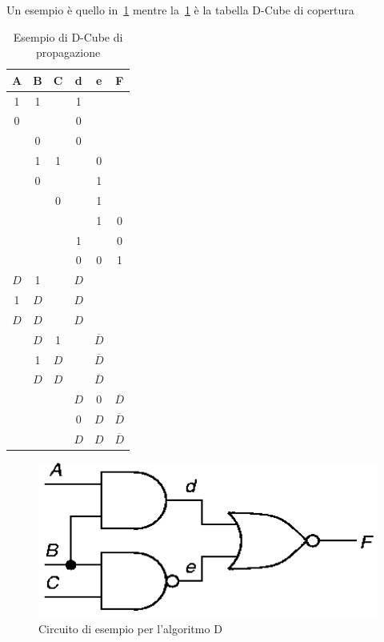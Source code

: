 Un esempio è quello in \figurename\,\ref{fig:dalgoexe} mentre la \tablename\,\ref{tab:dcube} è la tabella D-Cube di copertura
\begin{table}
\centering
\begin{tabular}{|c|c|c|c|c|c|}
\hline
A & B & C & d & e & F \\
\hline
 1 & 1 &   & 1 &   &   \\
 0 &   &   & 0 &   &   \\
   & 0 &   & 0 &   &   \\
   & 1 & 1 &   & 0 &   \\
   & 0 &   &   & 1 &   \\
   &   & 0 &   & 1 &   \\
   &   &   &   & 1 & 0 \\
   &   &   & 1 &   & 0 \\
   &   &   & 0 & 0 & 1 \\
\hline
 $D$ & 1 &   & $D$ &   &   \\
 1 & $D$ &   & $D$ &   &   \\
 $D$ & $D$ &   & $D$ &   &   \\
   & $D$ & 1 &   & $\overline{D}$ &   \\
   & 1 & $D$ &   & $\overline{D}$ &   \\
   & $D$ & $D$ &   & $\overline{D}$ &   \\
   &   &   & $D$ & 0 & $\overline{D}$ \\
   &   &   & 0 & $D$ & $\overline{D}$ \\
   &   &   & $D$ & $D$ & $\overline{D}$ \\
\hline
\end{tabular}
\caption{Esempio di D-Cube di propagazione}\label{tab:dcube}
\end{table}
\begin{figure}
\centering
\includegraphics[scale=0.4]{img/dalgoexe.png}
\caption{Circuito di esempio per l'algoritmo D}\label{fig:dalgoexe}
\end{figure}
